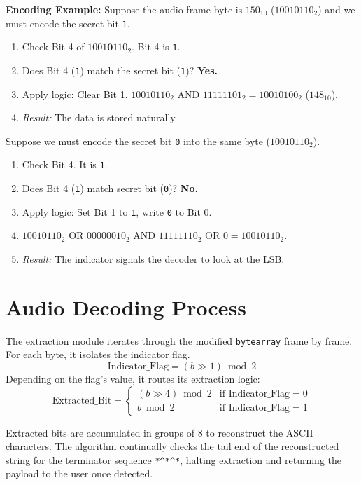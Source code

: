 \documentclass[12pt,a4paper]{report}
\begin{document}
\textbf{Encoding Example:}
Suppose the audio frame byte is $150_{10}$ ($10010110_2$) and we must encode the secret bit \texttt{1}.
\begin{enumerate}
    \item Check Bit 4 of $1001\mathbf{0}110_2$. Bit 4 is \texttt{1}.
    \item Does Bit 4 (\texttt{1}) match the secret bit (\texttt{1})? \textbf{Yes.}
    \item Apply logic: Clear Bit 1. $10010110_2 \text{ AND } 11111101_2 = 10010100_2$ ($148_{10}$).
    \item \textit{Result:} The data is stored naturally. 
\end{enumerate}

Suppose we must encode the secret bit \texttt{0} into the same byte ($10010110_2$).
\begin{enumerate}
    \item Check Bit 4. It is \texttt{1}. 
    \item Does Bit 4 (\texttt{1}) match secret bit (\texttt{0})? \textbf{No.}
    \item Apply logic: Set Bit 1 to \texttt{1}, write \texttt{0} to Bit 0.
    \item $10010110_2 \text{ OR } 00000010_2 \text{ AND } 11111110_2 \text{ OR } 0 = 10010110_2$.
    \item \textit{Result:} The indicator signals the decoder to look at the LSB.
\end{enumerate}

\section{Audio Decoding Process}
The extraction module iterates through the modified \texttt{bytearray} frame by frame. For each byte, it isolates the indicator flag.
\begin{equation}
    \text{Indicator\_Flag} = (b \gg 1) \bmod 2
\end{equation}
Depending on the flag's value, it routes its extraction logic:
\begin{equation}
    \text{Extracted\_Bit} = \begin{cases}
        (b \gg 4) \bmod 2 & \text{if Indicator\_Flag} = 0 \\
        b \bmod 2 & \text{if Indicator\_Flag} = 1
    \end{cases}
\end{equation}

Extracted bits are accumulated in groups of 8 to reconstruct the ASCII characters. The algorithm continually checks the tail end of the reconstructed string for the terminator sequence \texttt{*\^{}*\^{}*}, halting extraction and returning the payload to the user once detected.
\end{document}
